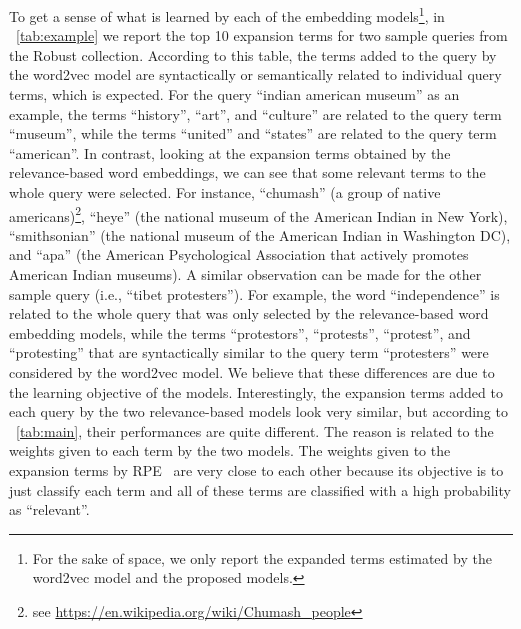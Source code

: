 \documentclass[sigconf]{acmart}
\begin{document}
To get a sense of what is learned by each of the embedding models\footnote{For the sake of space, we only report the expanded terms estimated by the word2vec model and the proposed models.}, in \tablename~\ref{tab:example} we report the top 10 expansion terms for two sample queries from the Robust collection. According to this table, the terms added to the query by the word2vec model are syntactically or semantically related to individual query terms, which is expected. For the query ``indian american museum'' as an example, the terms ``history'', ``art'', and ``culture'' are related to the query term ``museum'', while the terms ``united'' and ``states'' are related to the query term ``american''. In contrast, looking at the expansion terms obtained by the relevance-based word embeddings, we can see that some relevant terms to the whole query were selected. For instance, ``chumash'' (a group of native americans)\footnote{see \url{https://en.wikipedia.org/wiki/Chumash_people}}, ``heye'' (the national museum of the American Indian in New York), ``smithsonian'' (the national museum of the American Indian in Washington DC), and ``apa'' (the American Psychological Association that actively promotes American Indian museums). A similar observation can be made for the other sample query (i.e., ``tibet protesters''). For example, the word ``independence'' is related to the whole query that was only selected by the relevance-based word embedding models, while the terms ``protestors'', ``protests'', ``protest'', and ``protesting'' that are syntactically similar to the query term ``protesters'' were considered by the word2vec model. We believe that these differences are due to the learning objective of the models. Interestingly, the expansion terms added to each query by the two relevance-based models look very similar, but according to \tablename~\ref{tab:main}, their performances are quite different. The reason is related to the weights given to each term by the two models. The weights given to the expansion terms by {RPE~} are very close to each other because its objective is to just classify each term and all of these terms are classified with a high probability as ``relevant''.
\end{document}
